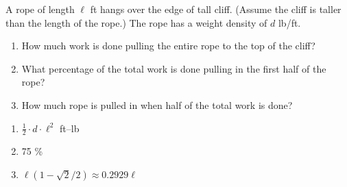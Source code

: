 {A rope of length $\ell$ ft hangs over the edge of tall cliff. (Assume the cliff is taller than the length of the rope.) The rope has a weight density of $d$ lb/ft.
	\begin{enumerate}
	\item		How much work is done pulling the entire rope to the top of the cliff?
	\item		What percentage of the total work is done pulling in the first half of the rope?
	\item		How much rope is pulled in when half of the total work is done?
	\end{enumerate}}
{\begin{enumerate}
	\item 	$\frac12\cdot d\cdot \ell^2$ ft--lb
	\item		75 \%
	\item		$\ell(1-\sqrt{2}/2) \approx 0.2929\ell$
	\end{enumerate}
}
